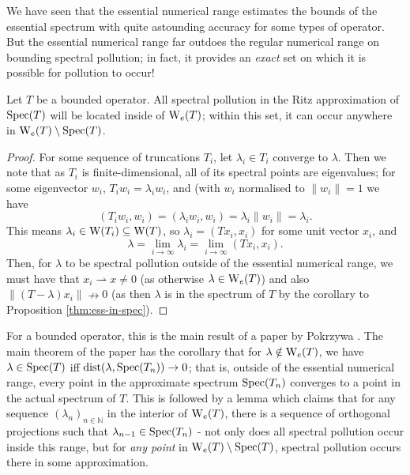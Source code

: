 \documentclass[../main.tex]{subfiles}
\begin{document}
We have seen that the essential numerical range estimates the bounds of the essential spectrum with quite astounding accuracy for some types of
operator. But the essential numerical range far outdoes the regular numerical range on bounding spectral pollution; in fact, it provides an \emph{exact}
set on which it is possible for pollution to occur! 

\begin{theorem}
Let $T$ be a bounded operator. All spectral pollution in the Ritz approximation of $\mathrm{Spec}(T)$ will be located inside of $\mathrm{W}_e(T)$; within this set, it can occur anywhere in $\mathrm{W}_e(T) \setminus \mathrm{Spec}(T)$.
\end{theorem}

\begin{proof}
For some sequence of truncations $T_i$, let $\lambda_i \in T_i$ converge to $\lambda$. Then we note that as $T_i$ is finite-dimensional, all of its
spectral points are eigenvalues; for some eigenvector $w_i$, $T_iw_i = \lambda_i w_i$, and (with $w_i$ normalised to $\|w_i\| = 1$ we have
$$(T_i w_i, w_i) = (\lambda_i w_i, w_i) = \lambda_i \|w_i\| = \lambda_i.$$
This means $\lambda_i \in \mathrm{W}(T_i) \subseteq \mathrm{W}(T)$, so $\lambda_i = (T x_i, x_i)$ for some unit vector $x_i$, and
$$\lambda = \lim_{i \rightarrow \infty} \lambda_i = \lim_{i \rightarrow \infty}(Tx_i, x_i).$$
Then, for $\lambda$ to be spectral pollution outside of the essential numerical range, we must have that $x_i \rightharpoonup x \neq 0$ (as otherwise
$\lambda \in \mathrm{W}_e(T)$) and also $\|(T - \lambda)x_i\| \nrightarrow 0$ (as then $\lambda$ is in the spectrum of $T$ by the corollary to Proposition \ref{thm:ess-in-spec}).
\end{proof}

For a bounded operator, this is the main result of a paper by Pokrzywa \parencite{pokrzywa1979method}. The main theorem of the paper has the
corollary that for $\lambda \notin \mathrm{W}_e(T)$, we have $\lambda \in \mathrm{Spec}(T)$ iff $\text{dist}(\lambda, \mathrm{Spec}(T_n)) \rightarrow 0$; that is, outside of the
essential numerical range, every point in the approximate spectrum $\mathrm{Spec}(T_n)$ converges to a point in the actual spectrum of $T$. This is followed by
a lemma which claims that for any sequence $(\lambda_n)_{n \in \mathbb{N}}$ in the interior of $\mathrm{W}_e(T)$, there is a sequence of orthogonal projections such that $\lambda_{n-1} \in \mathrm{Spec}(T_n)$ - not only does all spectral pollution occur inside this range, but for \emph{any point} in 
$\mathrm{W}_e(T) \setminus \mathrm{Spec}(T)$, spectral pollution occurs there in some approximation.
\end{document}
